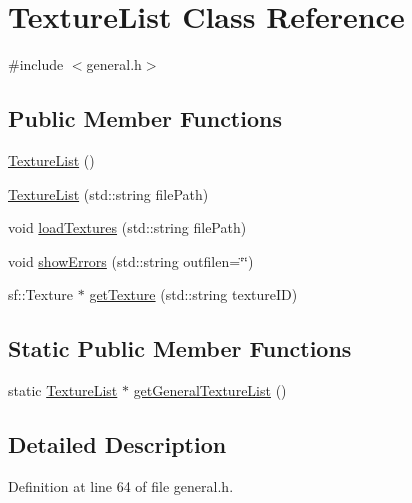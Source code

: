\hypertarget{class_texture_list}{\section{Texture\-List Class Reference}
\label{class_texture_list}
}


{\ttfamily \#include $<$general.\-h$>$}

\subsection*{Public Member Functions}
\begin{DoxyCompactItemize}
\item 
\hyperlink{class_texture_list_a750d37ace9aed214e8cbe1f940faf06f}{Texture\-List} ()
\item 
\hyperlink{class_texture_list_af10f38dd97933b3efd473b0bd2bafa77}{Texture\-List} (std\-::string file\-Path)
\item 
void \hyperlink{class_texture_list_a4c8c84b6df51995e568d7119d70f89a7}{load\-Textures} (std\-::string file\-Path)
\item 
void \hyperlink{class_texture_list_ade252d75b421d1b1a7ada32240e5c131}{show\-Errors} (std\-::string outfilen=\char`\"{}\char`\"{})
\item 
sf\-::\-Texture $\ast$ \hyperlink{class_texture_list_a27e768ab0f66150d4b45b5d4d0f08e4b}{get\-Texture} (std\-::string texture\-I\-D)
\end{DoxyCompactItemize}
\subsection*{Static Public Member Functions}
\begin{DoxyCompactItemize}
\item 
static \hyperlink{class_texture_list}{Texture\-List} $\ast$ \hyperlink{class_texture_list_ab97506e3c31990bf341103d1d4589829}{get\-General\-Texture\-List} ()
\end{DoxyCompactItemize}


\subsection{Detailed Description}


Definition at line 64 of file general.\-h.



